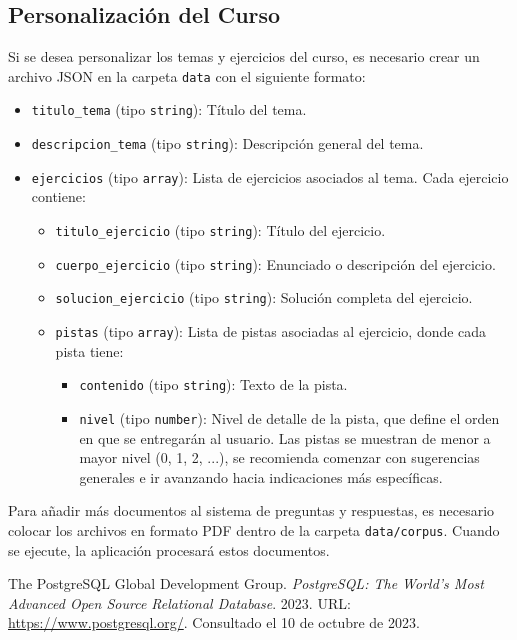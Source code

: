\documentclass{article}
\begin{document}
\subsection{Personalización del Curso}

Si se desea personalizar los temas y ejercicios del curso, es necesario crear un archivo JSON en la carpeta \texttt{data} con el siguiente formato:
\begin{itemize}
    \item \texttt{titulo\_tema} (tipo \texttt{string}): Título del tema.
    \item \texttt{descripcion\_tema} (tipo \texttt{string}): Descripción general del tema.
    \item \texttt{ejercicios} (tipo \texttt{array}): Lista de ejercicios asociados al tema. Cada ejercicio contiene:
    \begin{itemize}
        \item \texttt{titulo\_ejercicio} (tipo \texttt{string}): Título del ejercicio.
        \item \texttt{cuerpo\_ejercicio} (tipo \texttt{string}): Enunciado o descripción del ejercicio.
        \item \texttt{solucion\_ejercicio} (tipo \texttt{string}): Solución completa del ejercicio.
        \item \texttt{pistas} (tipo \texttt{array}): Lista de pistas asociadas al ejercicio, donde cada pista tiene:
        \begin{itemize}
            \item \texttt{contenido} (tipo \texttt{string}): Texto de la pista.
            \item \texttt{nivel} (tipo \texttt{number}): Nivel de detalle de la pista, que define el orden en que se entregarán al usuario. Las pistas se muestran de menor a mayor nivel (0, 1, 2, ...), se recomienda comenzar con sugerencias generales e ir avanzando hacia indicaciones más específicas.
        \end{itemize}
    \end{itemize}
\end{itemize}

Para añadir más documentos al sistema de preguntas y respuestas, es necesario colocar los archivos en formato PDF dentro de la carpeta \texttt{data/corpus}. Cuando se ejecute, la aplicación procesará estos documentos.

\begin{thebibliography}{99}

  The PostgreSQL Global Development Group. 
  \textit{PostgreSQL: The World's Most Advanced Open Source Relational Database}. 
  2023. 
  URL: \url{https://www.postgresql.org/}. 
  Consultado el 10 de octubre de 2023.

\end{thebibliography}
\end{document}
